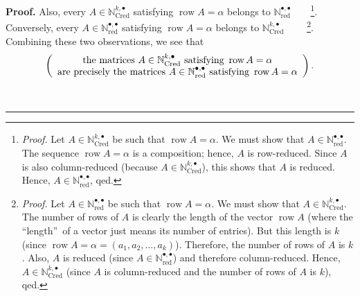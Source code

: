 \documentclass[numbers=enddot,12pt,final,onecolumn,notitlepage,abstracton]{scrartcl}%
\theoremstyle{definition}
\newenvironment{proof}[1][Proof]{\noindent\textbf{#1.} }{\ \rule{0.5em}{0.5em}}
\begin{document}
\begin{proof}
Also, every $A\in\mathbb{N}_{\operatorname*{Cred}}^{k,\bullet}$ satisfying
$\operatorname*{row}A=\alpha$ belongs to $\mathbb{N}_{\operatorname*{red}%
}^{\bullet,\bullet}$\ \ \ \ \footnote{\textit{Proof.} Let $A\in\mathbb{N}%
_{\operatorname*{Cred}}^{k,\bullet}$ be such that $\operatorname*{row}%
A=\alpha$. We must show that $A\in\mathbb{N}_{\operatorname*{red}}%
^{\bullet,\bullet}$. The sequence $\operatorname*{row}A=\alpha$ is a
composition; hence, $A$ is row-reduced. Since $A$ is also column-reduced
(because $A\in\mathbb{N}_{\operatorname*{Cred}}^{k,\bullet}$), this shows that
$A$ is reduced. Hence, $A\in\mathbb{N}_{\operatorname*{red}}^{\bullet,\bullet
}$, qed.}. Conversely, every $A\in\mathbb{N}_{\operatorname*{red}}%
^{\bullet,\bullet}$ satisfying $\operatorname*{row}A=\alpha$ belongs to
$\mathbb{N}_{\operatorname*{Cred}}^{k,\bullet}$%
\ \ \ \ \footnote{\textit{Proof.} Let $A\in\mathbb{N}_{\operatorname*{red}%
}^{\bullet,\bullet}$ be such that $\operatorname*{row}A=\alpha$. We must show
that $A\in\mathbb{N}_{\operatorname*{Cred}}^{k,\bullet}$. The number of rows
of $A$ is clearly the length of the vector $\operatorname*{row}A$ (where the
\textquotedblleft length\textquotedblright\ of a vector just means its number
of entries). But this length is $k$ (since $\operatorname*{row}A=\alpha
=\left(  a_{1},a_{2},\ldots,a_{k}\right)  $). Therefore, the number of rows of
$A$ is $k$. Also, $A$ is reduced (since $A\in\mathbb{N}_{\operatorname*{red}%
}^{\bullet,\bullet}$) and therefore column-reduced. Hence, $A\in
\mathbb{N}_{\operatorname*{Cred}}^{k,\bullet}$ (since $A$ is column-reduced
and the number of rows of $A$ is $k$), qed.}. Combining these two
observations, we see that
\begin{equation}
\left(
\begin{array}
[c]{c}%
\text{the matrices }A\in\mathbb{N}_{\operatorname*{Cred}}^{k,\bullet}\text{
satisfying }\operatorname*{row}A=\alpha\\
\text{are precisely the matrices }A\in\mathbb{N}_{\operatorname*{red}%
}^{\bullet,\bullet}\text{ satisfying }\operatorname*{row}A=\alpha
\end{array}
\right)  . \label{pf.prop.QSym.secondcomult.alt.helper5}%
\end{equation}



\end{proof}
\end{document}
